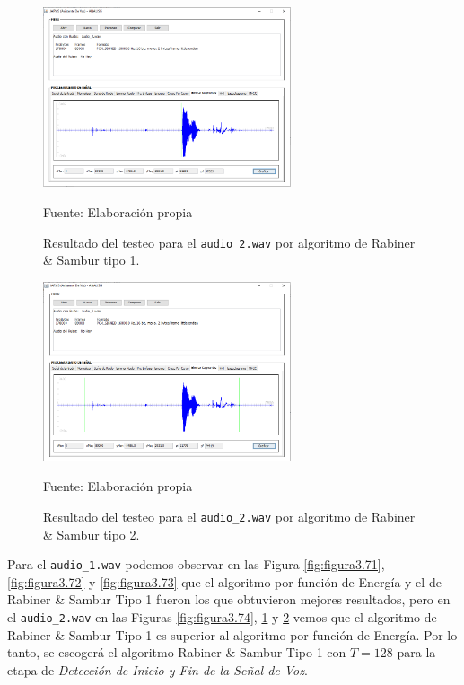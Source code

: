 \begin{figure}[H]
\begin{center}
\includegraphics[width=0.65\textwidth]{Imagenes/Cap3/image075}
\end{center}
\begin{center}
\vskip -0.5cm
\caption{\small{Resultado del testeo para el \texttt{audio\_2.wav} por algoritmo de Rabiner \& Sambur tipo 1.}}
\label{fig:figura3.75}
{\small{Fuente: Elaboración propia}}
\end{center}
\end{figure}

\vskip -1cm

\begin{figure}[H]
\begin{center}
\includegraphics[width=0.65\textwidth]{Imagenes/Cap3/image076}
\end{center}
\begin{center}
\vskip -0.5cm
\caption{\small{Resultado del testeo para el \texttt{audio\_2.wav} por algoritmo de Rabiner \& Sambur tipo 2.}}
\label{fig:figura3.76}
{\small{Fuente: Elaboración propia}}
\end{center}
\end{figure}

Para el \texttt{audio\_1.wav} podemos observar en las Figura \ref{fig:figura3.71}, \ref{fig:figura3.72} y \ref{fig:figura3.73} que el algoritmo por función de Energía y el de Rabiner \& Sambur Tipo 1 fueron los que obtuvieron mejores resultados, pero en el \texttt{audio\_2.wav} en las Figuras \ref{fig:figura3.74}, \ref{fig:figura3.75} y \ref{fig:figura3.76} vemos que el algoritmo de Rabiner \& Sambur Tipo 1 es superior al algoritmo por función de Energía. Por lo tanto, se escogerá el algoritmo Rabiner \& Sambur Tipo 1 con $T=128$ para la etapa de \textit{Detección de Inicio y Fin de la Señal de Voz}.

